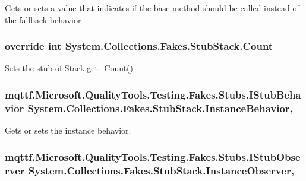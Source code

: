Gets or sets a value that indicates if the base method should be called instead of the fallback behavior

\hypertarget{class_system_1_1_collections_1_1_fakes_1_1_stub_stack_ab864e9949f485c113d49cdecdaf36302}{
\subsubsection[{Count}]{\setlength{\rightskip}{0pt plus 5cm}override int System.\-Collections.\-Fakes.\-Stub\-Stack.\-Count\hspace{0.3cm}{\ttfamily [get]}}}\label{class_system_1_1_collections_1_1_fakes_1_1_stub_stack_ab864e9949f485c113d49cdecdaf36302}


Sets the stub of Stack.\-get\-\_\-\-Count()

\hypertarget{class_system_1_1_collections_1_1_fakes_1_1_stub_stack_aa1ddc2986aea492c51ff79103178b9b0}{
\subsubsection[{Instance\-Behavior}]{\setlength{\rightskip}{0pt plus 5cm}mqttf.\-Microsoft.\-Quality\-Tools.\-Testing.\-Fakes.\-Stubs.\-I\-Stub\-Behavior System.\-Collections.\-Fakes.\-Stub\-Stack.\-Instance\-Behavior\hspace{0.3cm}{\ttfamily [get]}, {\ttfamily [set]}}}\label{class_system_1_1_collections_1_1_fakes_1_1_stub_stack_aa1ddc2986aea492c51ff79103178b9b0}


Gets or sets the instance behavior.

\hypertarget{class_system_1_1_collections_1_1_fakes_1_1_stub_stack_a4ba4d10a89530136db322800567a2f18}{
\subsubsection[{Instance\-Observer}]{\setlength{\rightskip}{0pt plus 5cm}mqttf.\-Microsoft.\-Quality\-Tools.\-Testing.\-Fakes.\-Stubs.\-I\-Stub\-Observer System.\-Collections.\-Fakes.\-Stub\-Stack.\-Instance\-Observer\hspace{0.3cm}{\ttfamily [get]}, {\ttfamily [set]}}}\label{class_system_1_1_collections_1_1_fakes_1_1_stub_stack_a4ba4d10a89530136db322800567a2f18}


